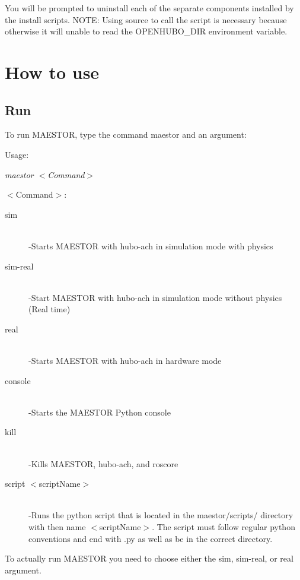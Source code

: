 \documentclass[12pt]{article}
\begin{document}
You will be prompted to uninstall each of the separate components installed by the install scripts. 
NOTE: Using source to call the script is necessary because otherwise it will unable to read the OPENHUBO\_DIR environment variable.
\pagebreak

\section{How to use}

\subsection{Run}

To run MAESTOR, type the command maestor and an argument:

Usage:
\begin{center}
	\textit{maestor $<$Command$>$} 
\end{center}
$<$Command$>$:
	\begin{description}
		\item[sim] \hfill \\
		-Starts MAESTOR with hubo-ach in simulation mode with physics
		\item[sim-real] \hfill \\
		-Start MAESTOR with hubo-ach in simulation mode without physics (Real time)
		\item[real] \hfill \\
		-Starts MAESTOR with hubo-ach in hardware mode
		\item[console] \hfill \\ 
		-Starts the MAESTOR Python console
		\item[kill] \hfill \\
		-Kills MAESTOR, hubo-ach, and roscore
		\item[script $<$scriptName$>$] \hfill \\
		-Runs the python script that is located in the maestor/scripts/ directory with then name $<$scriptName$>$. The script must follow regular python conventions and end with .py as well as be in the correct directory.
	\end{description}

\noindent To actually run MAESTOR you need to choose either the sim, sim-real, or real argument.\\
\end{document}
